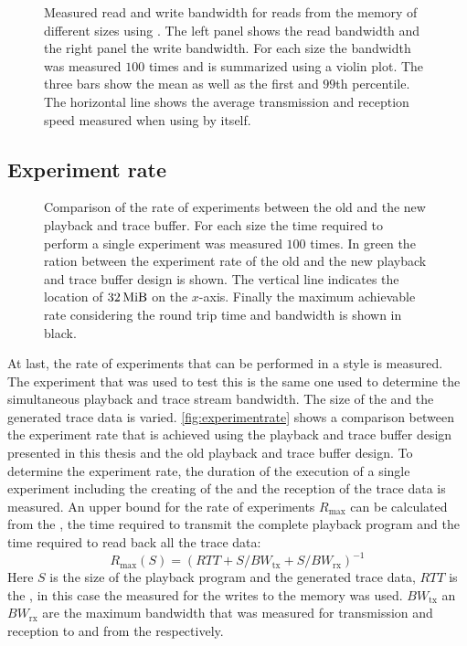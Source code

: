 \begin{figure}[htbp]
\caption{Measured read and write bandwidth for reads from the \DDR{} memory of different sizes using \FAXI{}. The left panel shows the read bandwidth and the right panel the write bandwidth. For each size the bandwidth was measured $\num{100}$ times and is summarized using a violin plot. The three bars show the mean as well as the first and $99$th percentile. The horizontal line shows the average transmission and reception speed measured when using \HostARQ{} by itself.}\label{fig:faxi_bw}
\end{figure}

\subsection{Experiment rate}\label{sec:rate}
\begin{figure}[htbp]
\caption{Comparison of the rate of experiments between the old and the new playback and trace buffer. For each size the time required to perform a single experiment was measured $\num{100}$ times. In green the ration between the experiment rate of the old and the new playback and trace buffer design is shown. The vertical line indicates the location of $\SI{32}{\mebi\byte}$ on the $x$-axis. Finally the maximum achievable rate considering the round trip time and \HostARQ{} bandwidth is shown in black.}\label{fig:experimentrate}
\end{figure}
At last, the rate of experiments that can be performed in a \HWinTheLoop{} style is measured. The experiment that was used to test this is the same one used to determine the simultaneous playback and trace stream bandwidth. The size of the \PlaybackProgram{} and the generated trace data is varied. \autoref{fig:experimentrate} shows a comparison between the experiment rate that is achieved using the playback and trace buffer design presented in this thesis and the old playback and trace buffer design. To determine the experiment rate, the duration of the execution of a single experiment including the creating of the \PlaybackProgram{} and the reception of the trace data is measured.
An upper bound for the rate of experiments $R_{\text{max}}$ can be calculated from the \rtt{}, the time required to transmit the complete playback program and the time required to read back all the trace data:
\[R_{\text{max}}(S) = {\left(RTT + S / BW_{\text{tx}} + S / BW_{\text{rx}}\right)}^{-1}\]
Here $S$ is the size of the playback program and the generated trace data, $RTT$ is the \rtt{}, in this case the \rtt{} measured for the \FAXI{} writes to the \DDR{} memory was used. $BW_{\text{tx}}$ an $BW_{\text{rx}}$ are the maximum bandwidth that was measured for transmission and reception to and from the \FPGA{} respectively.
